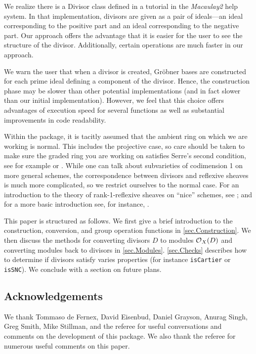 \documentclass[11pt]{amsart}
\begin{document}
We realize there is a Divisor class defined in a tutorial in the \emph{Macaulay2} help system.  In that implementation, divisors are given as a pair of ideals---an ideal corresponding to the positive part and an ideal corresponding to the negative part. Our approach offers the advantage that it is easier for the user to see the structure of the divisor.  Additionally, certain operations are much faster in our approach.

We warn the user that when a divisor is created, Gr\"obner bases are constructed for each prime ideal defining a component of the divisor.  Hence, the construction phase may be slower than other potential implementations (and in fact slower than our initial implementation).  However, we feel that this choice offers advantages of execution speed for several functions as well as substantial improvements in code readability.

Within the package, it is tacitly assumed that the ambient ring on which we are working is normal.  This includes the projective case, so care should be taken to make sure the graded ring you are working on satisfies Serre's second condition, see for example \cite[Theorem 8.22A]{Hartshorne} or \cite[Proposition 2.2.21]{BrunsHerzog}.  While one can talk about subvarieties of codimension 1 on more general schemes, the correspondence between divisors and reflexive sheaves is much more complicated, so we restrict ourselves to the normal case.  For an introduction to the theory of rank-1-reflexive sheaves on ``nice'' schemes, see \cite{HartshorneGeneralizedDivisorsOnGorensteinSchemes,HartshonreGeneralizedDivisorsAndBiliaison}; and for a more basic introduction see, for instance, \cite[Chapter II, Sections 5--7]{Hartshorne}.

This paper is structured as follows.  We first give a brief introduction to the construction, conversion, and group operation functions in \autoref{sec.Construction}.  We then discuss the methods for converting divisors $D$ to modules $\mbox{$\mathcal{O}$}_X(D)$ and converting modules back to divisors in \autoref{sec.Modules}.  \autoref{sec.Checks} describes how to determine if divisors satisfy varies properties (for instance {\tt isCartier} or {\tt isSNC}).  We conclude with a section on future plans.

\subsection*{Acknowledgements}

We thank Tommaso de Fernex, David Eisenbud, Daniel Grayson, Anurag Singh, Greg Smith, Mike Stillman, and the referee for useful conversations and comments on the development of this package.  We also thank the referee for numerous useful comments on this paper.
\end{document}
